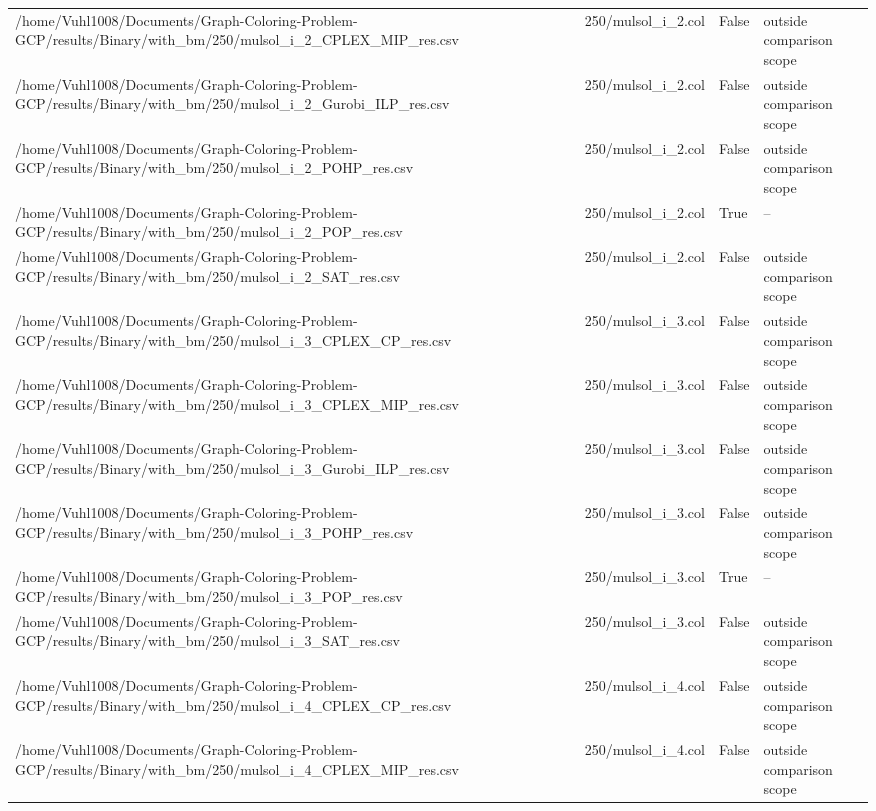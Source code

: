 \begin{table}[htbp]
\begin{tabular}{llll}
/home/Vuhl1008/Documents/Graph-Coloring-Problem-GCP/results/Binary/with\_bm/250/mulsol\_i\_2\_CPLEX\_MIP\_res.csv & 250/mulsol\_i\_2.col & False & outside comparison scope \\
/home/Vuhl1008/Documents/Graph-Coloring-Problem-GCP/results/Binary/with\_bm/250/mulsol\_i\_2\_Gurobi\_ILP\_res.csv & 250/mulsol\_i\_2.col & False & outside comparison scope \\
/home/Vuhl1008/Documents/Graph-Coloring-Problem-GCP/results/Binary/with\_bm/250/mulsol\_i\_2\_POHP\_res.csv & 250/mulsol\_i\_2.col & False & outside comparison scope \\
/home/Vuhl1008/Documents/Graph-Coloring-Problem-GCP/results/Binary/with\_bm/250/mulsol\_i\_2\_POP\_res.csv & 250/mulsol\_i\_2.col & True & -- \\
/home/Vuhl1008/Documents/Graph-Coloring-Problem-GCP/results/Binary/with\_bm/250/mulsol\_i\_2\_SAT\_res.csv & 250/mulsol\_i\_2.col & False & outside comparison scope \\
/home/Vuhl1008/Documents/Graph-Coloring-Problem-GCP/results/Binary/with\_bm/250/mulsol\_i\_3\_CPLEX\_CP\_res.csv & 250/mulsol\_i\_3.col & False & outside comparison scope \\
/home/Vuhl1008/Documents/Graph-Coloring-Problem-GCP/results/Binary/with\_bm/250/mulsol\_i\_3\_CPLEX\_MIP\_res.csv & 250/mulsol\_i\_3.col & False & outside comparison scope \\
/home/Vuhl1008/Documents/Graph-Coloring-Problem-GCP/results/Binary/with\_bm/250/mulsol\_i\_3\_Gurobi\_ILP\_res.csv & 250/mulsol\_i\_3.col & False & outside comparison scope \\
/home/Vuhl1008/Documents/Graph-Coloring-Problem-GCP/results/Binary/with\_bm/250/mulsol\_i\_3\_POHP\_res.csv & 250/mulsol\_i\_3.col & False & outside comparison scope \\
/home/Vuhl1008/Documents/Graph-Coloring-Problem-GCP/results/Binary/with\_bm/250/mulsol\_i\_3\_POP\_res.csv & 250/mulsol\_i\_3.col & True & -- \\
/home/Vuhl1008/Documents/Graph-Coloring-Problem-GCP/results/Binary/with\_bm/250/mulsol\_i\_3\_SAT\_res.csv & 250/mulsol\_i\_3.col & False & outside comparison scope \\
/home/Vuhl1008/Documents/Graph-Coloring-Problem-GCP/results/Binary/with\_bm/250/mulsol\_i\_4\_CPLEX\_CP\_res.csv & 250/mulsol\_i\_4.col & False & outside comparison scope \\
/home/Vuhl1008/Documents/Graph-Coloring-Problem-GCP/results/Binary/with\_bm/250/mulsol\_i\_4\_CPLEX\_MIP\_res.csv & 250/mulsol\_i\_4.col & False & outside comparison scope \\

\end{tabular}
\end{table}
